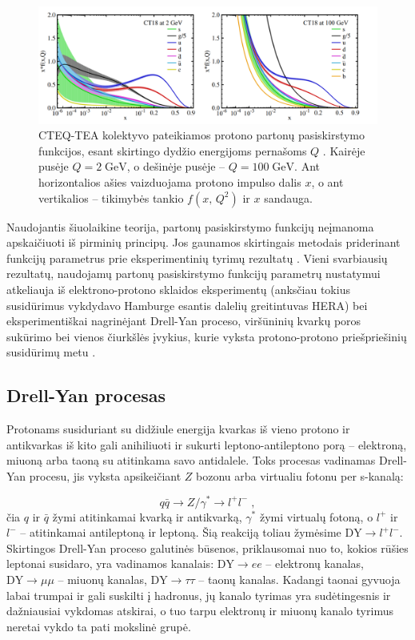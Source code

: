 \documentclass[a4paper, 12pt, oneside]{article}
\newcommand{\DYee}{\mathrm{DY} \! \rightarrow \! ee}
\newcommand{\DYmumu}{\mathrm{DY} \! \rightarrow \! \mu\mu}
\newcommand{\DYtau}{\mathrm{DY} \! \rightarrow \! \tau\tau}
\newcommand{\DY}{\mathrm{DY}}
\newlength\q
\begin{document}
\begin{figure}[t]
	\includegraphics[width=\linewidth]{CT18_PDF.png}
	\caption{\label{fig:PDFs}
		CTEQ-TEA kolektyvo pateikiamos protono partonų pasiskirstymo funkcijos, esant skirtingo dydžio energijoms pernašoms $Q$ \cite{CTEQ2019}.
		Kairėje pusėje $Q=2 \; \mathrm{GeV}$, o dešinėje pusėje -- $Q=100 \; \mathrm{GeV}$.
		Ant horizontalios ašies vaizduojama protono impulso dalis $x$, o ant vertikalios -- tikimybės tankio $f(x,\, Q^2)$
		ir $x$ sandauga.}
\end{figure}

Naudojantis šiuolaikine teorija, partonų pasiskirstymo funkcijų neįmanoma apskaičiuoti iš pirminių principų.
Jos gaunamos skirtingais metodais priderinant funkcijų parametrus prie eksperimentinių tyrimų rezultatų
\cite{PDF_MMHT2015, PDF_CJ15, NNPDF, PDF_ABMP16, PDF_MMHT2019, CTEQ2019}.
Vieni svarbiausių rezultatų, naudojamų partonų pasiskirstymo funkcijų parametrų nustatymui atkeliauja iš elektrono-protono
sklaidos eksperimentų (anksčiau tokius susidūrimus vykdydavo Hamburge esantis dalelių greitintuvas HERA) bei eksperimentiškai nagrinėjant
Drell-Yan proceso, viršūninių kvarkų poros sukūrimo bei vienos čiurkšlės įvykius, kurie vyksta protono-protono priešpriešinių susidūrimų
metu \cite{CTEQ2019}.


\subsection{Drell-Yan procesas}
Protonams susiduriant su didžiule energija kvarkas iš vieno protono ir antikvarkas iš kito gali anihiliuoti ir sukurti leptono-antileptono
porą -- elektroną, miuoną arba taoną su atitinkama savo antidalele.
Toks procesas vadinamas Drell-Yan procesu, jis vyksta apsikeičiant $Z$ bozonu arba virtualiu fotonu per s-kanalą:

\begin{equation*}
	q\bar{q} \rightarrow Z/ \gamma^{*} \rightarrow l^{+}l^{-} \; ,
\end{equation*}
čia $q$ ir $\bar{q}$ žymi atitinkamai kvarką ir antikvarką, $\gamma^*$ žymi virtualų fotoną, o $l^+$ ir $l^-$ -- atitinkamai
antileptoną ir leptoną.
Šią reakciją toliau žymėsime $\DY \! \rightarrow \! l^{+}l^{-}$.
Skirtingos Drell-Yan proceso galutinės būsenos, priklausomai nuo to, kokios rūšies leptonai susidaro, yra
vadinamos kanalais: $\DYee$ -- elektronų kanalas, $\DYmumu$ -- miuonų kanalas, $\DYtau$ -- taonų kanalas.
Kadangi taonai gyvuoja labai trumpai ir gali suskilti į hadronus, jų kanalo tyrimas yra sudėtingesnis ir dažniausiai vykdomas atskirai,
o tuo tarpu elektronų ir miuonų kanalo tyrimus neretai vykdo ta pati mokslinė grupė.
\end{document}
